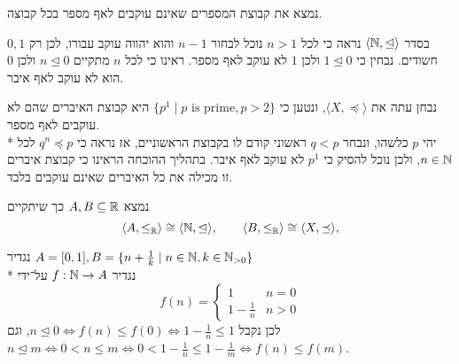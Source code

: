 \Subquestion{}
נמצא את קבוצת המספרים שאינם עוקבים לאף מספר בכל קבוצה.

בסדר $\langle \mathbb{N}, \trianglelefteq \rangle$
נראה כי לכל $n > 1$ נוכל לבחור $n - 1$ והוא יהווה עוקב עבורו, לכן רק $0, 1$ חשודים.
נבחין כי $1 \trianglelefteq 0$ ולכן $1$ לא עוקב לאף מספר.
ראינו כי לכל $n$ מתקיים $n \trianglelefteq 0$ ולכן $0$ הוא לא עוקב לאף איבר.

נבחן עתה את $\langle X, \preceq \rangle$, ונטען כי $\{ p^1 \mid p \text{ is prime}, p > 2 \}$ היא קבוצת האיברים שהם לא עוקבים לאף מספר. \\*
יהי $p$ כלשהו, ונבחר $q < p$ ראשוני קודם לו בקבוצת הראשוניים, אז נראה כי $q^n \preceq p$ לכל $n \in \mathbb{N}$, ולכן נוכל להסיק כי $p^1$ לא עוקב לאף איבר.
בתהליך ההוכחה הראינו כי קבוצת איברים זו מכילה את כל האיברים שאינם עוקבים בלבד.

\Subquestion{}
נמצא $A, B \subseteq \mathbb{R}$ כך שיתקיים
\[
	\langle A, \le_{\mathbb{R}} \rangle \cong \langle \mathbb{N}, \trianglelefteq \rangle,
	\qquad
	\langle B, \le_{\mathbb{R}} \rangle \cong \langle X, \preceq \rangle,
\]

נגדיר $A = [0, 1], B = \{ n + \frac{1}{k} \mid n \in \mathbb{N}, k \in \mathbb{N}_{>0} \}$ \\*
נגדיר $f : \mathbb{N} \to A$ על־ידי
\[
	f(n) = \begin{cases}
		1 & n = 0 \\
		1 - \frac{1}{n} & n > 0
	\end{cases}
\]
לכן נקבל $n \trianglelefteq 0 \iff f(n) \le f(0) \iff 1 - \frac{1}{n} \le 1$, וגם $n \trianglelefteq m \iff 0 < n \le m \iff 0 < 1 - \frac{1}{n} \le 1 - \frac{1}{m} \iff f(n) \le f(m)$.


